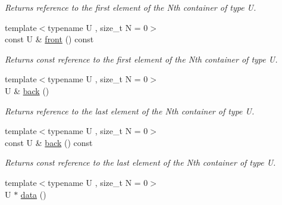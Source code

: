 \begin{DoxyCompactItemize}
\begin{DoxyCompactList}\small\item\em Returns reference to the first element of the Nth container of type U. \end{DoxyCompactList}\item 
\hypertarget{classheterogeneous_1_1heterovector_3_01_t_00_01_types_8_8_8_4_a6bc78c3a332f808aa77d7fe11425d764}{}{\footnotesize template$<$typename U , size\+\_\+t N = 0$>$ }\\const U \& \hyperlink{classheterogeneous_1_1heterovector_3_01_t_00_01_types_8_8_8_4_a6bc78c3a332f808aa77d7fe11425d764}{front} () const \label{classheterogeneous_1_1heterovector_3_01_t_00_01_types_8_8_8_4_a6bc78c3a332f808aa77d7fe11425d764}

\begin{DoxyCompactList}\small\item\em Returns const reference to the first element of the Nth container of type U. \end{DoxyCompactList}\item 
\hypertarget{classheterogeneous_1_1heterovector_3_01_t_00_01_types_8_8_8_4_a8b88e5b9c42af3539bcda9ea0927ee89}{}{\footnotesize template$<$typename U , size\+\_\+t N = 0$>$ }\\U \& \hyperlink{classheterogeneous_1_1heterovector_3_01_t_00_01_types_8_8_8_4_a8b88e5b9c42af3539bcda9ea0927ee89}{back} ()\label{classheterogeneous_1_1heterovector_3_01_t_00_01_types_8_8_8_4_a8b88e5b9c42af3539bcda9ea0927ee89}

\begin{DoxyCompactList}\small\item\em Returns reference to the last element of the Nth container of type U. \end{DoxyCompactList}\item 
\hypertarget{classheterogeneous_1_1heterovector_3_01_t_00_01_types_8_8_8_4_a575ac76e572a94001f06e9a77defd648}{}{\footnotesize template$<$typename U , size\+\_\+t N = 0$>$ }\\const U \& \hyperlink{classheterogeneous_1_1heterovector_3_01_t_00_01_types_8_8_8_4_a575ac76e572a94001f06e9a77defd648}{back} () const \label{classheterogeneous_1_1heterovector_3_01_t_00_01_types_8_8_8_4_a575ac76e572a94001f06e9a77defd648}

\begin{DoxyCompactList}\small\item\em Returns const reference to the last element of the Nth container of type U. \end{DoxyCompactList}\item 
\hypertarget{classheterogeneous_1_1heterovector_3_01_t_00_01_types_8_8_8_4_a7f1829bd8235eeb064f5fec463986b89}{}{\footnotesize template$<$typename U , size\+\_\+t N = 0$>$ }\\U $\ast$ \hyperlink{classheterogeneous_1_1heterovector_3_01_t_00_01_types_8_8_8_4_a7f1829bd8235eeb064f5fec463986b89}{data} ()\label{classheterogeneous_1_1heterovector_3_01_t_00_01_types_8_8_8_4_a7f1829bd8235eeb064f5fec463986b89}


\end{DoxyCompactItemize}
